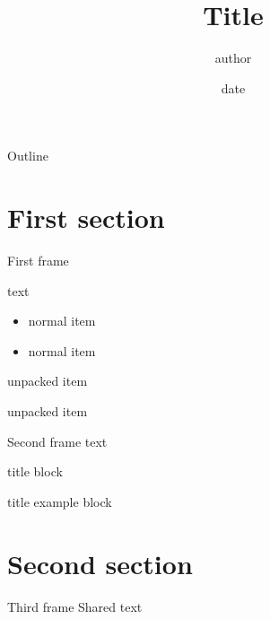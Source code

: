 \documentclass{beamer}
\title{Title}
\author[author]{{author}}
\institute[institute]{\url{email}}
\date{date}
\newenvironment{unpacked_itemize}{
\begin{itemize}
  \setlength{\itemsep}{10pt}
  \setlength{\parskip}{0pt}
  \setlength{\parsep}{0pt}
}{\end{itemize}}
\begin{document}
\begin{frame}
  \titlepage
\end{frame}

\begin{frame}{Outline}
\tableofcontents
\end{frame}



\section{First section}

\begin{frame}[t]{First frame}

text 

\begin{itemize}
\item normal item
\item normal item
\end{itemize}

\begin{unpacked_itemize}
\item unpacked item
\item unpacked item
\end{unpacked_itemize}
\end{frame}

\begin{frame}[t]{Second frame}
text

\begin{block}{title}
block
\end{block}

\begin{exampleblock}{title}
example block
\end{exampleblock}
\end{frame}

\section{Second section}
\begin{frame}{Third frame}
Shared text

\end{frame}
\end{document}

